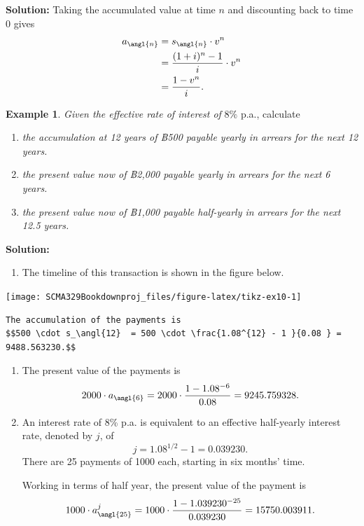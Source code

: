\documentclass[
]{book}
\providecommand{\tightlist}{%
  \setlength{\itemsep}{0pt}\setlength{\parskip}{0pt}}
\theoremstyle{definition}
\theoremstyle{definition}
\newtheorem{example}{Example}[chapter]
\theoremstyle{definition}
\theoremstyle{definition}
\theoremstyle{remark}
\begin{document}
\textbf{Solution:} Taking the accumulated value at time \(n\) and discounting
back to time 0 gives \[\begin{aligned}
    a_\angl{n} &= s_\angl{n} \cdot v^n \\
            &= \frac{(1+i)^{n} - 1}{i} \cdot v^n \\
            &=  \frac{1 - v^n }{i}.\end{aligned}\]

\begin{example}

\emph{Given the effective rate of interest of} \(8\%\) p.a., calculate

\begin{enumerate}
\def\labelenumi{\arabic{enumi}.}
\item
  \emph{the accumulation at 12 years of ฿500 payable yearly in arrears for
  the next 12 years.}
\item
  \emph{the present value now of ฿2,000 payable yearly in arrears for the
  next 6 years.}
\item
  \emph{the present value now of ฿1,000 payable half-yearly in arrears for
  the next 12.5 years.}
\end{enumerate}

\end{example}

\textbf{Solution:}

\begin{enumerate}
\def\labelenumi{\arabic{enumi}.}
\tightlist
\item
  The timeline of this transaction is shown in the figure below.
\end{enumerate}

\begin{center}\texttt{[image: SCMA329Bookdownproj\_files/figure-latex/tikz-ex10-1]} \end{center}

\begin{verbatim}
The accumulation of the payments is
$$500 \cdot s_\angl{12}  = 500 \cdot \frac{1.08^{12} - 1 }{0.08 } = 9488.563230.$$
\end{verbatim}

\begin{enumerate}
\def\labelenumi{\arabic{enumi}.}
\setcounter{enumi}{1}
\item
  The present value of the payments is
  \[2000\cdot a_\angl{6}  = 2000 \cdot \frac{1 - 1.08^{-6} }{0.08 } = 9245.759328.\]
\item
  An interest rate of 8\% p.a. is equivalent to an effective
  half-yearly interest rate, denoted by \(j\), of
  \[j = 1.08^{1/2} -1 = 0.039230.\] There are 25 payments of 1000
  each, starting in six months' time.

  Working in terms of half year, the present value of the payment is
  \[1000 \cdot a^j_\angl{25} = 1000 \cdot \frac{1 - 1.039230^{-25} }{0.039230 } = 15750.003911.\]
\end{enumerate}
\end{document}

